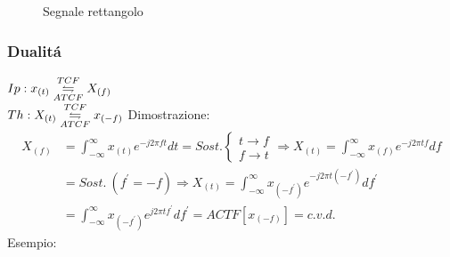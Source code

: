 {\begin{figure}[H]
                        \caption{Segnale rettangolo}
                        \label{fig:es linearita}
                    \end{figure}                    
                }
                

        \subsubsection{Dualitá}\label{Dualita}
            $Ip: x_{(t)} \overunderset{TCF}{ATCF}{\leftrightharpoons} X_{(f)}$\\        
            $Th: X_{(t)} \overunderset{TCF}{ATCF}{\leftrightharpoons} x_{(-f)}$ 
            Dimostrazione:
            \begin{align}
                X_{(f)} & = \int_{-\infty}^{\infty} x_{(t)} e^{-j2\pi ft} dt = Sost. \begin{cases}
                    t \rightarrow f\\
                    f \rightarrow t
                \end{cases} \Rightarrow  X_{(t)} = \int_{-\infty}^{\infty} x_{(f)} e^{-j2\pi tf} df \nonumber \\
                        & =Sost.\ (f^\prime = -f) \Rightarrow  X_{(t)} = \int_{-\infty}^{\infty} x_{(-f^\prime)} e^{-j2\pi t(-f^\prime)} df^\prime\nonumber \\
                        & =\int_{-\infty}^{\infty} x_{(-f^\prime)} e^{j2\pi tf^\prime} df^\prime= ACTF[x_{(-f)}] = c.v.d.  \nonumber
            \end{align}
            Esempio:\\

